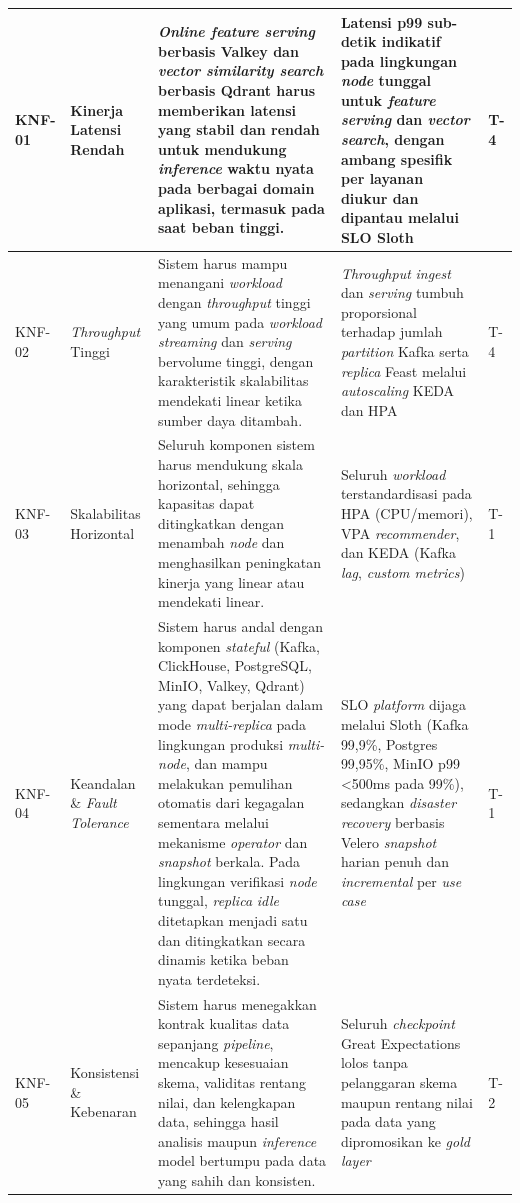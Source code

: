 {\begin{longtable}{|>{\centering\arraybackslash}m{1cm}|m{2.5cm}|m{5.1cm}|m{3cm}|>{\centering\arraybackslash}m{1.2cm}|}
KNF-01 & Kinerja Latensi Rendah & \textit{Online feature serving} berbasis Valkey dan \textit{vector similarity search} berbasis Qdrant harus memberikan latensi yang stabil dan rendah untuk mendukung \textit{inference} waktu nyata pada berbagai domain aplikasi, termasuk pada saat beban tinggi. & Latensi p99 sub-detik indikatif pada lingkungan \textit{node} tunggal untuk \textit{feature serving} dan \textit{vector search}, dengan ambang spesifik per layanan diukur dan dipantau melalui SLO Sloth & T-4 \\
\hline
KNF-02 & \textit{Throughput} Tinggi & Sistem harus mampu menangani \textit{workload} dengan \textit{throughput} tinggi yang umum pada \textit{workload} \textit{streaming} dan \textit{serving} bervolume tinggi, dengan karakteristik skalabilitas mendekati linear ketika sumber daya ditambah. & \textit{Throughput} \textit{ingest} dan \textit{serving} tumbuh proporsional terhadap jumlah \textit{partition} Kafka serta \textit{replica} Feast melalui \textit{autoscaling} KEDA dan HPA & T-4 \\
\hline
KNF-03 & Skalabilitas Horizontal & Seluruh komponen sistem harus mendukung skala horizontal, sehingga kapasitas dapat ditingkatkan dengan menambah \textit{node} dan menghasilkan peningkatan kinerja yang linear atau mendekati linear. & Seluruh \textit{workload} terstandardisasi pada HPA (CPU/memori), VPA \textit{recommender}, dan KEDA (Kafka \textit{lag}, \textit{custom metrics}) & T-1 \\
\hline
KNF-04 & Keandalan \& \textit{Fault Tolerance} & Sistem harus andal dengan komponen \textit{stateful} (Kafka, ClickHouse, PostgreSQL, MinIO, Valkey, Qdrant) yang dapat berjalan dalam mode \textit{multi-replica} pada lingkungan produksi \textit{multi-node}, dan mampu melakukan pemulihan otomatis dari kegagalan sementara melalui mekanisme \textit{operator} dan \textit{snapshot} berkala. Pada lingkungan verifikasi \textit{node} tunggal, \textit{replica} \textit{idle} ditetapkan menjadi satu dan ditingkatkan secara dinamis ketika beban nyata terdeteksi. & SLO \textit{platform} dijaga melalui Sloth (Kafka 99,9\%, Postgres 99,95\%, MinIO p99 <500ms pada 99\%), sedangkan \textit{disaster recovery} berbasis Velero \textit{snapshot} harian penuh dan \textit{incremental} per \textit{use case} & T-1 \\
\hline
KNF-05 & Konsistensi \& Kebenaran & Sistem harus menegakkan kontrak kualitas data sepanjang \textit{pipeline}, mencakup kesesuaian skema, validitas rentang nilai, dan kelengkapan data, sehingga hasil analisis maupun \textit{inference} model bertumpu pada data yang sahih dan konsisten. & Seluruh \textit{checkpoint} Great Expectations lolos tanpa pelanggaran skema maupun rentang nilai pada data yang dipromosikan ke \textit{gold layer} & T-2 \\

\end{longtable}}

